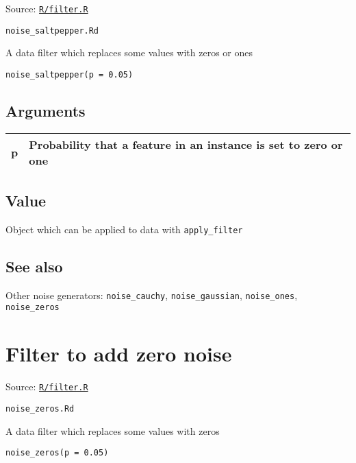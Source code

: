 Source:
\href{https://github.com/fdavidcl/ruta/blob/master/R/filter.R}{\texttt{R/filter.R}}

\texttt{noise\_saltpepper.Rd}

A data filter which replaces some values with zeros or ones

\begin{verbatim}
noise_saltpepper(p = 0.05)
\end{verbatim}

\hypertarget{arguments}{\subsection{\texorpdfstring{\protect\hyperlink{arguments}{}Arguments}{Arguments}}\label{arguments}}

\begin{longtable}[c]{@{}>{\small}p{3cm}>{\raggedright}p{12.5cm}@{}}
\toprule
p & Probability that a feature in an instance is set to zero or
one\tabularnewline
\bottomrule
\end{longtable}

\hypertarget{value}{\subsection{\texorpdfstring{\protect\hyperlink{value}{}Value}{Value}}\label{value}}

Object which can be applied to data with \texttt{apply\_filter}

\hypertarget{see-also}{\subsection{\texorpdfstring{\protect\hyperlink{see-also}{}See
also}{See also}}\label{see-also}}

Other noise generators: \texttt{noise\_cauchy},
\texttt{noise\_gaussian}, \texttt{noise\_ones}, \texttt{noise\_zeros}

\section{Filter to add zero noise}\label{filter-to-add-zero-noise}

Source:
\href{https://github.com/fdavidcl/ruta/blob/master/R/filter.R}{\texttt{R/filter.R}}

\texttt{noise\_zeros.Rd}

A data filter which replaces some values with zeros

\begin{verbatim}
noise_zeros(p = 0.05)
\end{verbatim}

